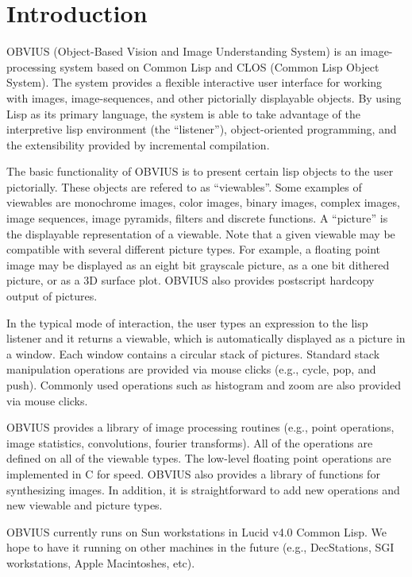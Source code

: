 \section{Introduction}


OBVIUS (Object-Based Vision and Image Understanding System) is an
image-processing system based on Common Lisp and CLOS (Common Lisp
Object System).  The system provides a flexible interactive user
interface for working with images, image-sequences, and other
pictorially displayable objects.  By using Lisp as its primary
language, the system is able to take advantage of the interpretive
lisp environment (the ``listener''), object-oriented programming, and
the extensibility provided by incremental compilation.

The basic functionality of OBVIUS is to present certain lisp objects
to the user pictorially.  These objects are refered to as
``viewables''.  Some examples of viewables are
monochrome images, color images, binary images, complex images, image
sequences, image pyramids, filters and discrete functions.  A
``picture''  is the displayable representation of a
viewable.  Note that a given viewable may be compatible with several
different picture types.  For example, a floating point image may be
displayed as an eight bit grayscale picture, as a one bit dithered
picture, or as a 3D surface plot.  OBVIUS also provides postscript
hardcopy output of pictures.

In the typical mode of interaction, the user types an expression to
the lisp listener and it returns a viewable, which is automatically
displayed as a picture in a window.  Each window contains a circular
stack of pictures.  Standard stack manipulation operations are
provided via mouse clicks (e.g., cycle, pop, and push).  Commonly used
operations such as histogram and zoom are also provided via mouse
clicks.

OBVIUS provides a library of image processing routines (e.g., point
operations, image statistics, convolutions, fourier transforms).  All
of the operations are defined on all of the viewable types.  The
low-level floating point operations are implemented in C for speed.
OBVIUS also provides a library of functions for synthesizing images.
In addition, it is straightforward to add new operations and new
viewable and picture types.

OBVIUS currently runs on Sun workstations in Lucid v4.0 Common Lisp.
We hope to have it running on other machines in the future (e.g.,
DecStations, SGI workstations, Apple Macintoshes, etc).  

